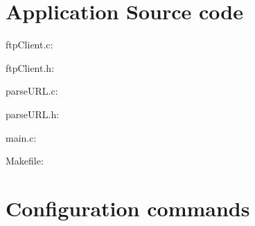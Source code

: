 \documentclass[11pt,a4paper,reqno]{article}
\numberwithin{equation}{section}
\begin{document}
\begin{appendices}

\section{Application Source code}

\begin{Large}
ftpClient.c:
\end{Large}



\vspace{15mm}

\begin{Large}
ftpClient.h:
\end{Large}



\vspace{15mm}

\begin{Large}
parseURL.c:
\end{Large}



\vspace{15mm}

\begin{Large}
parseURL.h:
\end{Large}



\vspace{15mm}

\begin{Large}
main.c:
\end{Large}



\vspace{15mm}

\begin{Large}
Makefile:
\end{Large}



\vspace{15mm}

\section{Configuration commands}
\label{sec:commands}


\end{appendices}
\end{document}
